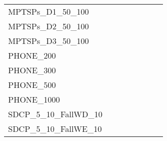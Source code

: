 \begin{table}[H]
{\begin{tabular}{|l|ll|ll|l|l|l|}
			MPTSPs\_D1\_50\_100            &                                 &                                &                                  &                                 &                                    &                            &                            \\
			MPTSPs\_D2\_50\_100            &                                 &                                &                                  &                                 &                                    &                            &                            \\
			MPTSPs\_D3\_50\_100            &                                 &                                &                                  &                                 &                                    &                            &                            \\ \hline
			PHONE\_200                     &                                 &                                &                                  &                                 &                                    &                            &                            \\
			PHONE\_300                     &                                 &                                &                                  &                                 &                                    &                            &                            \\
			PHONE\_500                     &                                 &                                &                                  &                                 &                                    &                            &                            \\
			PHONE\_1000                    &                                 &                                &                                  &                                 &                                    &                            &                            \\ \hline
			SDCP\_5\_10\_FallWD\_10        &                                 &                                &                                  &                                 &                                    &                            &                            \\
			SDCP\_5\_10\_FallWE\_10        &                                 &                                &                                  &                                 &                                    &                            &                            \\

\end{tabular}}
\end{table}
